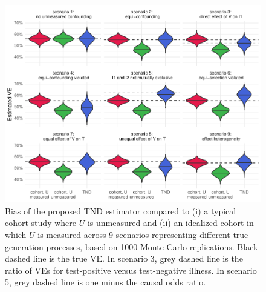 \documentclass[11pt]{article}
\begin{document}
\begin{figure}
    \centering
    \includegraphics{sims.pdf}
    \caption{Bias of the proposed TND estimator compared to (i) a typical cohort study where $U$ is unmeasured and (ii) an idealized cohort in which $U$ is measured across 9 scenarios representing different true generation processes, based on 1000 Monte Carlo replications. Black dashed line is the true VE. In scenario 3, grey dashed line is the ratio of VEs for test-positive versus test-negative illness. In scenario 5, grey dashed line is one minus the causal odds ratio.}
    \label{fig:sims}
\end{figure}

\clearpage

\end{document}

